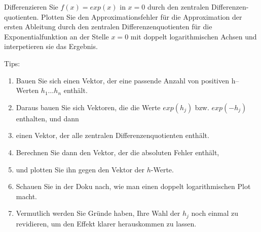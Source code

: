 \begin{aufg}[0]
Differenzieren Sie $f(x)=exp(x)$ in $x=0$ durch den zentralen Differenzen-
quotienten. Plotten Sie den Approximationsfehler für die Approximation der
ersten Ableitung durch den zentralen Differenzenquotienten für die 
Exponentialfunktion an der Stelle $x=0$ mit doppelt logarithmischen Achsen und
interpetieren sie das Ergebnis.

Tips:
\begin{enumerate}
\item Bauen Sie sich einen Vektor, der eine passende Anzahl von positiven
h–Werten $h_1 \ldots h_n$ enthält.
\item Daraus bauen Sie sich Vektoren, die die Werte $exp(h_j)$ bzw. $exp(−h_j)$
enthalten, und dann
\item einen Vektor, der alle zentralen Differenzenquotienten enthält.
\item Berechnen Sie dann den Vektor, der die absoluten Fehler enthält,
\item und plotten Sie ihn gegen den Vektor der $h$-Werte.
\item Schauen Sie in der Doku nach, wie man einen doppelt logarithmischen
Plot macht.
\item Vermutlich werden Sie Gründe haben, Ihre Wahl der $h_j$ noch einmal
zu revidieren, um den Effekt klarer herauskommen zu lassen.
\end{enumerate}
\end{aufg}